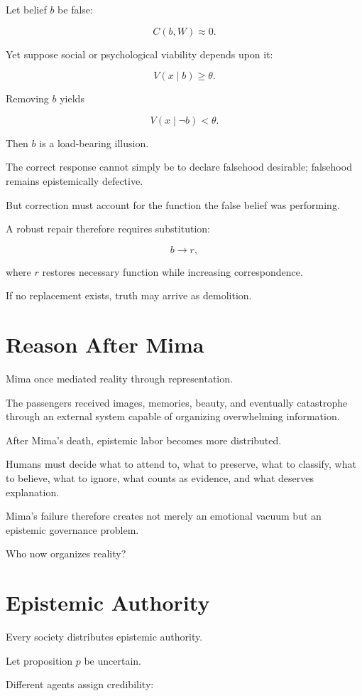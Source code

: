 \documentclass[11pt,oneside]{book}
\theoremstyle{definition}
\theoremstyle{remark}
\begin{document}
Let belief \(b\) be false:

\[
C(b,W)\approx0.
\]

Yet suppose social or psychological viability depends upon it:

\[
V(x\mid b)\geq\theta.
\]

Removing \(b\) yields

\[
V(x\mid\neg b)<\theta.
\]

Then \(b\) is a load-bearing illusion.

The correct response cannot simply be to declare falsehood desirable; falsehood remains epistemically defective.

But correction must account for the function the false belief was performing.

A robust repair therefore requires substitution:

\[
b
\rightarrow
r,
\]

where \(r\) restores necessary function while increasing correspondence.

If no replacement exists, truth may arrive as demolition.

\section{Reason After Mima}

Mima once mediated reality through representation.

The passengers received images, memories, beauty, and eventually catastrophe through an external system capable of organizing overwhelming information.

After Mima's death, epistemic labor becomes more distributed.

Humans must decide what to attend to, what to preserve, what to classify, what to believe, what to ignore, what counts as evidence, and what deserves explanation.

Mima's failure therefore creates not merely an emotional vacuum but an epistemic governance problem.

Who now organizes reality?

\section{Epistemic Authority}

Every society distributes epistemic authority.

Let proposition \(p\) be uncertain.

Different agents assign credibility:
\end{document}
